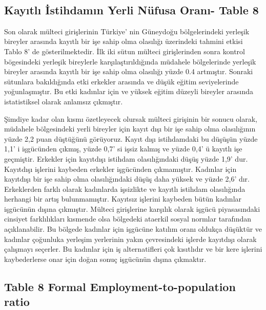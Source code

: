 \documentclass{article}
\begin{document}
\
\
{
\def\sym#1{\ifmmode^{#1}\else\(^{#1}\)\fi}

\newpage
    \subsection*{Kayıtlı İstihdamın Yerli Nüfusa Oranı- Table 8}
    Son olarak mülteci girişlerinin Türkiye’ nin Güneydoğu bölgelerindeki yerleşik bireyler arasında kayıtlı bir işe sahip olma olasılığı üzerindeki tahmini etkisi Tablo 8’ de gösterilmektedir. İlk iki sütun mülteci girişlerinden sonra kontrol bögesindeki yerleşik bireylerle karşılaştırıldığında müdahele bölgelerinde yerleşik bireyler arasında kayıtlı bir işe sahip olma olasılığı yüzde 0.4 artmıştır. Sonraki sütunlara bakıldığında etki erkekler arasında ve düşük eğitim seviyelerinde yoğunlaşmıştır. Bu etki kadınlar için ve yüksek eğitim düzeyli bireyler arasında istatistiksel olarak anlamsız çıkmıştır.  

Şimdiye kadar olan kısmı özetleyecek olursak mülteci girişinin bir sonucu olarak, müdahele bölgesindeki yerli bireyler için kayıt dışı bir işe sahip olma olasılığının yüzde 2,2 puan düştüğünü görüyoruz.
Kayıt dışı istihdamdaki bu düşüşün yüzde 1,1’ i işgücünden çıkmış, yüzde 0,7’ si işsiz kalmış ve yüzde 0,4’ ü kayıtlı işe geçmiştir. Erkekler için kayıtdışı istihdam olasılığındaki düşüş yüzde 1,9’ dur. Kayıtdışı işlerini kaybeden erkekler işgücünden çıkmamıştır. Kadınlar için kayıtdışı bir işe sahip olma olasılığındaki düşüş daha yüksek ve yüzde 2,6’ dır. Erkeklerden farklı olarak kadınlarda işsizlikte ve kayıtlı istihdam olasılığında herhangi bir artış bulunmamıştır. Kayıtsız işlerini kaybeden bütün kadınlar işgücünün dışına çıkmıştır. 
Mülteci girişlerine karşılık olarak işgücü piyasasındaki cinsiyet farklılıkları kısmende olsa bölgedeki ataerkil sosyal normlar tarafından açıklanabilir. Bu bölgede kadınlar için işgücüne katılım oranı oldukça düşüktür ve kadınlar çoğunluka yerleşim yerlerinin yakın çevresindeki işlerde kayıtdışı olarak çalışmayı seçerler. Bu kadınlar için iş alternatifleri çok kısıtlıdır ve bir kere işlerini kaybederlerse onar için doğan sonuç işgücünün dışına çıkmaktır. 

\subsection*{Table 8 Formal Employment-to-population ratio}

\begin{tabular}{l*{6}{c}}
\hline
\hline
            

\end{tabular}}
\end{document}
